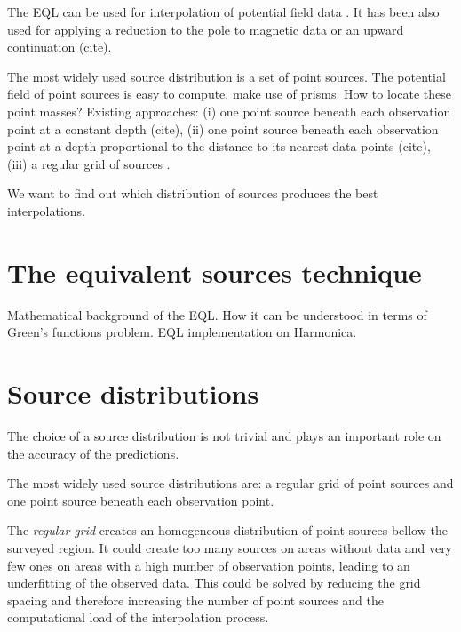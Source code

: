 \documentclass[twocolumn]{article}
\begin{document}
The EQL can be used for interpolation of potential field data \citep{cordell1992,
cooper2000}.
It has been also used for applying a reduction to the pole to magnetic data
\citep{guspi2009, silva1986, emilia1973, nakatsuka2006} or an upward continuation
(cite).

The most widely used source distribution is a set of point sources.
The potential field of point sources is easy to compute.
\citet{barnes2011} make use of prisms.
How to locate these point masses?
Existing approaches:
(i) one point source beneath each observation point at a constant depth (cite),
(ii) one point source beneath each observation point at a depth proportional to the
distance to its nearest data points (cite),
(iii) a regular grid of sources \citep{barnes2011}.

We want to find out which distribution of sources produces the best interpolations.



\section{The equivalent sources technique}

Mathematical background of the EQL\@.
How it can be understood in terms of Green's functions problem.
EQL implementation on Harmonica.



\section{Source distributions}


The choice of a source distribution is not trivial and plays an important role on the
accuracy of the predictions.

The most widely used source distributions are: a regular grid of point sources and
one point source beneath each observation point.

The \emph{regular grid} creates an homogeneous distribution of point sources bellow the
surveyed region.
It could create too many sources on areas without data and very few ones on
areas with a high number of observation points, leading to an underfitting of the
observed data.
This could be solved by reducing the grid spacing and therefore increasing the number of
point sources and the computational load of the interpolation process.
\end{document}
